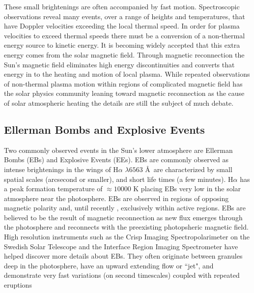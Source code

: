 \documentclass[]{aastex6}
\begin{document}
	These small brightenings are often accompanied by fast motion.  Spectroscopic observations reveal many events, over a range of heights and temperatures, that have Doppler velocities exceeding the local thermal speed.  In order for plasma velocities to exceed  thermal speeds there must be a conversion of a non-thermal energy source to kinetic energy. It is becoming widely accepted that this extra energy comes from the solar magnetic field.  Through magnetic reconnection the Sun's magnetic field eliminates high energy discontinuities and converts that energy in to the heating and motion of local plasma.  While repeated observations of non-thermal plasma motion within regions of complicated magnetic field has the solar physics community leaning toward magnetic reconnection as the cause of solar atmospheric heating the details are still the subject of much debate.	

	\subsection{Ellerman Bombs and Explosive Events}
	
	Two commonly observed events in the Sun's lower atmosphere are Ellerman Bombs (EBs) and Explosive Events (EEs). EBs \citep{Ellerman1917} are commonly observed as intense brightenings in the wings of H$\alpha$ $\lambda 6563$ \AA \,  are characterized by small spatial scales (arcsecond or smaller), and short life times (a few minutes). H$\alpha$ has a peak formation temperature of $\approx 10000$ K placing EBs very low in the solar atmosphere near the photosphere. EBs are observed in regions of opposing magnetic polarity and, until recently \citep{Nelson2017}, exclusively within active regions.  EBs are believed to be the result of magnetic reconnection as new flux emerges through the photosphere and reconnects with the preexisting photopsheric magnetic field.  High resolution instruments such as the Crisp Imaging Spectropolarimeter \citep[CHRISP;][]{CHRISP} on the Swedish Solar Telescope \citep[SST;][]{SST} and the Interface Region Imaging Spectrometer \citep[IRIS;][]{IRIS} have helped discover more details about EBs.  They often originate between granules deep in the photosphere, have an upward extending flow or ``jet", and demonstrate very fast variations (on second timescales) coupled with repeated eruptions \citep{Watanabe2011,Vissers2013,Vissers2015}
	
\end{document}
